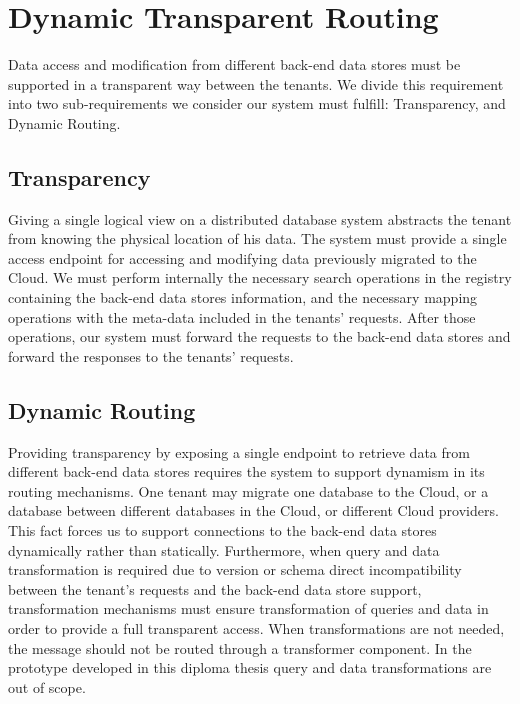 \section{Dynamic Transparent Routing}
\label{sec:dynamicrouting}

Data access and modification from different back-end data stores must be supported in a transparent way between the tenants. We divide this requirement into two sub-requirements we consider our system must fulfill: Transparency, and Dynamic Routing.

\subsection{Transparency}

Giving a single logical view on a distributed database system abstracts the tenant from knowing the physical location of his data. The system must provide a single access endpoint for accessing and modifying data previously migrated to the Cloud. We must perform internally the necessary search operations in the registry containing the back-end data stores information, and the necessary mapping operations with the meta-data included in the tenants' requests. After those operations, our system must forward the requests to the back-end data stores and forward the responses to the tenants' requests.

\subsection{Dynamic Routing}

Providing transparency by exposing a single endpoint to retrieve data from different back-end data stores requires the system to support dynamism in its routing mechanisms. One tenant may migrate one database to the Cloud, or  a database between different databases in the Cloud, or different Cloud providers. This fact forces us to support connections to the back-end data stores dynamically rather than statically. Furthermore, when query and data transformation is required due to version or schema direct incompatibility between the tenant's requests and the back-end data store support, transformation mechanisms must ensure transformation of queries and data in order to provide a full transparent access. When transformations are not needed, the message should not be routed through a transformer component. In the prototype developed in this diploma thesis query and data transformations are out of scope.

